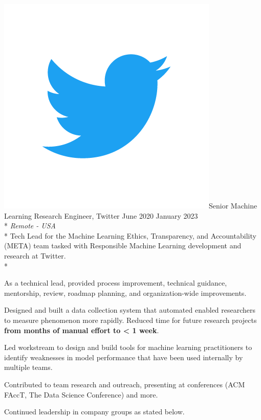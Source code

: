 \documentclass[print]{friggeri-cv} %
\newcommand{\twittericon}{\includegraphics[scale=0.05]{Twitter_Logo_Blue.png}}%
\begin{document}
\begin{description} \itemsep1pt \parskip0pt 
  \item \twittericon {\largeheaderfont Senior Machine Learning Research Engineer, Twitter}
    \hfill {\smallheaderfont June 2020 \textemdash January 2023}\\*
    {\footnotesize \emph{Remote - USA}}\\*
      Tech Lead for the Machine Learning Ethics, Transparency, and Accountability
      (META) team tasked with Responsible Machine Learning development and
      research at Twitter.\\*
      \begin{myitemize}

        \item As a technical lead, provided process improvement, technical guidance,
        mentorship, review, roadmap planning, and organization-wide improvements. 
        
        \item Designed and built a data collection system that
        automated enabled researchers to measure phenomenon more rapidly. Reduced time
        for future research projects \textbf{from months of manual effort to < 1 week}.
        
        \item Led workstream to design and build tools for machine learning
        practitioners to identify weaknesses in model performance that have been
        used internally by multiple teams.
        
        \item Contributed to team research\autocite{twitter_htl_racial_bias}\autocite{twitter_recsys_distributional_inequality}
        and outreach, presenting at conferences (ACM FAccT\autocite{facct_2022_talk}, The Data Science Conference\autocite{datascience_2022_talk})
        and more\autocite{privacy_enchancing_tech_post}.
        \item Continued leadership in company groups as stated below.

      \end{myitemize}
  \end{description}
\end{document}
